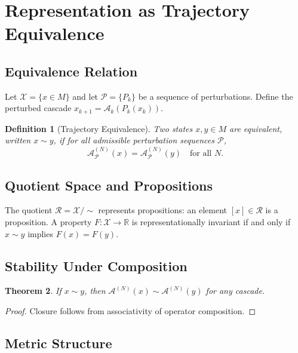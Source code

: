\documentclass[12pt, a4paper]{article}
\newtheorem{theorem}{Theorem}[section]
\newtheorem{definition}[theorem]{Definition}
\theoremstyle{remark}
\theoremstyle{definition}
\begin{document}
\section{Representation as Trajectory Equivalence}
\label{app:equiv}

\subsection{Equivalence Relation}

Let $\mathcal{X} = \{x \in M\}$ and let $\mathcal{P} = \{P_k\}$ be a sequence of
perturbations.  Define the perturbed cascade $x_{k+1} = \mathcal{A}_k(P_k(x_k))$.

\begin{definition}[Trajectory Equivalence]
Two states $x, y \in M$ are equivalent, written $x \sim y$, if for all admissible
perturbation sequences $\mathcal{P}$,
\[
\mathcal{A}^{(N)}_{\mathcal{P}}(x) = \mathcal{A}^{(N)}_{\mathcal{P}}(y)
\quad \text{for all } N.
\]
\end{definition}

\subsection{Quotient Space and Propositions}

The quotient $\mathcal{R} = \mathcal{X}/{\sim}$ represents propositions: an element
$[x] \in \mathcal{R}$ is a proposition.  A property $F\colon \mathcal{X} \to \mathbb{R}$
is representationally invariant if and only if $x \sim y$ implies $F(x) = F(y)$.

\subsection{Stability Under Composition}

\begin{theorem}
If $x \sim y$, then $\mathcal{A}^{(N)}(x) \sim \mathcal{A}^{(N)}(y)$ for any cascade.
\end{theorem}

\begin{proof}
Closure follows from associativity of operator composition.
\end{proof}

\subsection{Metric Structure}
\end{document}
